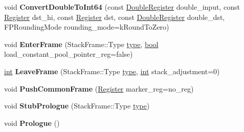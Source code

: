 \begin{DoxyCompactItemize}
\item 
\mbox{\label{classv8_1_1internal_1_1TurboAssembler_af23a79280dfc4fad2a87092aa8564581}} 
void {\bfseries Convert\+Double\+To\+Int64} (const \mbox{\hyperlink{classv8_1_1internal_1_1DoubleRegister}{Double\+Register}} double\+\_\+input, const \mbox{\hyperlink{classv8_1_1internal_1_1Register}{Register}} dst\+\_\+hi, const \mbox{\hyperlink{classv8_1_1internal_1_1Register}{Register}} dst, const \mbox{\hyperlink{classv8_1_1internal_1_1DoubleRegister}{Double\+Register}} double\+\_\+dst, F\+P\+Rounding\+Mode rounding\+\_\+mode=k\+Round\+To\+Zero)
\item 
\mbox{\label{classv8_1_1internal_1_1TurboAssembler_a57fdf7de333af641574c0bd4c4b7f8d4}} 
void {\bfseries Enter\+Frame} (Stack\+Frame\+::\+Type \mbox{\hyperlink{classstd_1_1conditional_1_1type}{type}}, \mbox{\hyperlink{classbool}{bool}} load\+\_\+constant\+\_\+pool\+\_\+pointer\+\_\+reg=false)
\item 
\mbox{\label{classv8_1_1internal_1_1TurboAssembler_a6eb2343cdde571931cf6e8f4c7033bd0}} 
\mbox{\hyperlink{classint}{int}} {\bfseries Leave\+Frame} (Stack\+Frame\+::\+Type \mbox{\hyperlink{classstd_1_1conditional_1_1type}{type}}, \mbox{\hyperlink{classint}{int}} stack\+\_\+adjustment=0)
\item 
\mbox{\label{classv8_1_1internal_1_1TurboAssembler_ad56dfd9e92f69e11627353ea1cbc7e25}} 
void {\bfseries Push\+Common\+Frame} (\mbox{\hyperlink{classv8_1_1internal_1_1Register}{Register}} marker\+\_\+reg=no\+\_\+reg)
\item 
\mbox{\label{classv8_1_1internal_1_1TurboAssembler_a2398db9e10af1223aee6d3d491de79e6}} 
void {\bfseries Stub\+Prologue} (Stack\+Frame\+::\+Type \mbox{\hyperlink{classstd_1_1conditional_1_1type}{type}})
\item 
\mbox{\label{classv8_1_1internal_1_1TurboAssembler_aebd70343720df393021ce72e183385b3}} 
void {\bfseries Prologue} ()
\item 
\mbox{\label{classv8_1_1internal_1_1TurboAssembler_a77b7c5e4d2ca11bf9d8884778cf43efb}} 

\end{DoxyCompactItemize}
